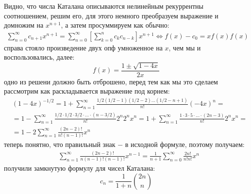 Видно, что числа Каталана описываются нелинейным рекуррентны соотношением, решим его, для этого немного преобразуем выражение и домножим на $x^{n+1}$, а затем просуммируем как обычно:
\[
	\begin{split}
		\sum_{n=0}^{\infty} c_{n+1}x^{n+1} = \sum_{n=0}^{\infty} \left[\sum_{k=0}^n c_kc_{n-k}\right]x^{n+1} \Leftrightarrow f\left(x\right) - c_0 = xf\left(x\right)f\left(x\right)
	\end{split}
\]
справа стояло произведение двух опф умноженное на $x$, чем мы и воспользовались, далее:
\[
	f\left(x\right) = \frac{1\pm\sqrt{1-4x}}{2x}
\]
одно из решени должно быть отброшено, перед тем как мы это сделаем рассмотрим как раскладывается выражение под корнем:
\[
	\begin{split}
		& \left(1-4x\right)^{-1/2} = 1 + \sum_{n=1}^{\infty} \frac{1/2\left(1/2-1\right)\left(1/2-2\right)...\left(1/2-n+1\right)}{n!} \left(-4x\right)^n = \\
		& = 1 - \sum_{n=1}^{\infty}\frac{1/2\cdot1/2\cdot3/2\cdot...\cdot\left(n-3/2\right)}{n!} 2^n2^nx^n = 1+\sum_{n=1}^\infty \frac{1\cdot3\cdot5\cdot...\cdot\left(2n-3\right)}{n!}2^nx^n = \\
		& = 1 - 2\sum_{n=1}^{\infty}\frac{\left(2n-2\right)!}{n!\left(n-1\right)!}x^n
	\end{split}
\]
теперь понятно, что правильный знак $-$ в исходной формуле, поэтому получаем:
\[
	\begin{split}
		& \sum_{n=1}^{\infty} \frac{\left(2n-2\right)!}{n\left(n-1\right)!\left(n-1\right)!} x^{n-1}  = \frac{1}{n+1}\sum_{n=0}^{\infty}\frac{2n!}{n!n!}x^n 
	\end{split}
\]
получили замкнутую формулу для чисел Каталана:
\begin{equation}
	c_n = \frac{1}{1+n}\binom{2n}{n}
\end{equation}

